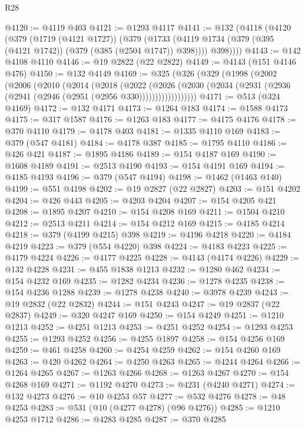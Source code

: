 \begin{lexlean}{R28}
\begin{coremodule}
@4120 := @4119 @403
@4121 := @1293 @4117
@4141 := @132
    (@4118
      (@4120
        (@379
          (@1719 (@4121 @1727))
          (@379
            (@1733 (@4119 @1734 (@379 (@395 (@4121 @1742)) (@379 (@385 (@2504 @1747)) @398))))
            @398))))
@4143 := @142 @4108 @4110
@4146 := @19 @2822 (@22 @2822)
@4149 := @4143 (@151 @4146 @476)
@4150 := @132 @4149
@4169 := @325
    (@326
      (@329
        (@1998
          (@2002
            (@2006
              (@2010
                (@2014
                  (@2018
                    (@2022
                      (@2026
                        (@2030
                          (@2034 (@2931 (@2936 (@2941 (@2946 (@2951 (@2956 @330))))))))))))))))))
@4171 := @513 (@324 @4169)
@4172 := @132 @4171
@4173 := @1264 @183
@4174 := @1588 @4173
@4175 := @317 @1587
@4176 := @1263 @183
@4177 := @4175 @4176
@4178 := @370 @4110
@4179 := @4178 @403
@4181 := @1335 @4110 @169
@4183 := @379 (@547 @4181)
@4184 := @4178 @387
@4185 := @1795 @4110
@4186 := @426 @421
@4187 := @1895 @4186
@4189 := @154 @4187 @169
@4190 := @1608 @4189
@4191 := @2513 @4190
@4193 := @154 @4191 @169
@4194 := @4185 @4193
@4196 := @379 (@547 @4194)
@4198 := @1462 (@1463 @140)
@4199 := @551 @4198
@4202 := @19 @2827 (@22 @2827)
@4203 := @151 @4202
@4204 := @426 @443
@4205 := @4203 @4204
@4207 := @154 @4205 @421
@4208 := @1895 @4207
@4210 := @154 @4208 @169
@4211 := @1504 @4210
@4212 := @2513 @4211
@4214 := @154 @4212 @169
@4215 := @4185 @4214
@4218 := @379 (@4199 @4215) @398
@4219 := @4196 @4218
@4220 := @4184 @4219
@4223 := @379 (@554 @4220) @398
@4224 := @4183 @4223
@4225 := @4179 @4224
@4226 := @4177 @4225
@4228 := @4143 (@4174 @4226)
@4229 := @132 @4228
@4231 := @455 @1838 @1213
@4232 := @1280 @462
@4234 := @154 @4232 @169
@4235 := @1282 @4234
@4236 := @1278 @4235
@4238 := @154 @4236 @1288
@4239 := @1278 @4238
@4240 := @3978 @4239
@4243 := @19 @2832 (@22 @2832)
@4244 := @151 @4243
@4247 := @19 @2837 (@22 @2837)
@4249 := @320 @4247 @169
@4250 := @154 @4249
@4251 := @1210 @1213
@4252 := @4251 @1213
@4253 := @4251 @4252
@4254 := @1293 @4253
@4255 := @1293 @4252
@4256 := @4255 @1897
@4258 := @154 @4256 @169
@4259 := @461 @4258
@4260 := @4254 @4259
@4262 := @154 @4260 @169
@4263 := @420 @4262
@4264 := @4250 @4263
@4265 := @4244 @4264
@4266 := @1264 @4265
@4267 := @1263 @4266
@4268 := @1263 @4267
@4270 := @154 @4268 @169
@4271 := @1192 @4270
@4273 := @4231 (@4240 @4271)
@4274 := @132 @4273
@4276 := @10 @4253 @57
@4277 := @532 @4276
@4278 := @48 @4253
@4283 := @531 (@10 (@4277 @4278) (@96 @4276))
@4285 := @1210 @4253 @1712
@4286 := @4283 @4285
@4287 := @370 @4285

\end{coremodule}
\end{lexlean}
